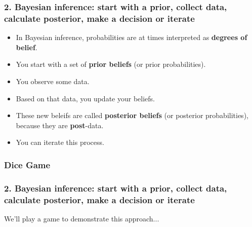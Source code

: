 \documentclass[slidestop,compress,mathserif,12pt,t,professionalfonts,xcolor=table]{beamer}
\begin{document}
\begin{frame}
\frametitle{2. Bayesian inference: start with a prior, collect data, calculate posterior, make a decision or iterate}

\begin{itemize}[<+->]

\item In Bayesian inference, probabilities are at times interpreted as \textbf{degrees of belief}.

\item You start with a set of \textbf{prior beliefs} (or prior probabilities).

\item You observe some data.

\item Based on that data, you update your beliefs.  

\item These new beleifs are called \textbf{posterior beliefs} (or posterior probabilities), because they are \textbf{post}-data.

\item You can iterate this process.

\end{itemize}

\end{frame}


\subsubsection{Dice Game}

\begin{frame}
\frametitle{2. Bayesian inference: start with a prior, collect data, calculate posterior, make a decision or iterate}

\vfill

We'll play a game to demonstrate this approach...

\vfill

\end{frame}

\end{document}
